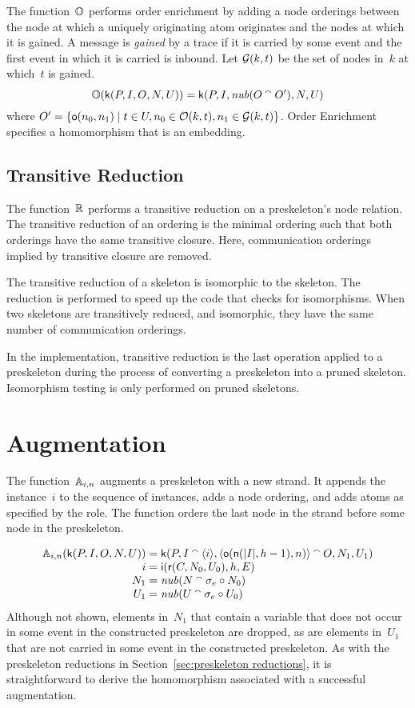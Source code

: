 \documentclass[12pt]{report}
\theoremstyle{definition}
\begin{document}
The function~$\mathbb O$ performs order enrichment by adding a node
orderings between the node at which a uniquely originating atom
originates and the nodes at which it is gained.  A message is
\emph{gained} by a trace if it is carried by some event
and the first event in which it is carried is inbound.  Let $\mathcal{G}(k,
t)$ be the set of nodes in~$k$ at which~$t$ is gained.
$$ \mathbb O(\operatorname{\mathsf{k}}(P, I, O, N, U))=
\operatorname{\mathsf{k}}(P, I, \operatorname{\mathit{nub}}(O\mathbin{{}^\smallfrown} O'), N, U)$$
where $O'=\{\operatorname{\mathsf{o}}(n_0,n_1)\mid t\in U, n_0\in\mathcal{O}(k,t),
n_1\in\mathcal{G}(k,t)\}$.  Order Enrichment specifies a homomorphism that
is an embedding.

\subsection{Transitive Reduction}

The function~$\mathbb R$ performs a transitive reduction on a preskeleton's
node relation.  The transitive reduction
of an ordering is the minimal ordering such that both orderings have
the same transitive closure.  Here, communication orderings implied by
transitive closure are removed.

The transitive reduction of a skeleton is isomorphic to the skeleton.
The reduction is performed to speed up the code that checks for
isomorphisms.  When two skeletons are transitively reduced, and
isomorphic, they have the same number of communication orderings.

In the implementation, transitive reduction is the last operation
applied to a preskeleton during the process of converting a
preskeleton into a pruned skeleton.  Isomorphism testing is only
performed on pruned skeletons.

\section{Augmentation}

The function~$\mathbb A_{i,n}$ augments a preskeleton with a new strand.
It appends the instance~$i$ to the sequence of instances, adds a node
ordering, and adds atoms as specified by the role.  The function
orders the last node in the strand before some node in the
preskeleton.

$$
\begin{array}{r@{}c@{}l}
\ops{A}_{i,n}(\cn{k}(P, I, O, N, U))&{}={}&
\cn{k}(P, I\append\langle i\rangle,
\langle \cn{o}(\cn{n}(|I|,h-1),n)
\rangle \append O,N_1, U_1)\\
i&{}={}&\cn{i}(\cn{r}(C,N_0,U_0),h,E)\\
N_1&{}={}&\fn{nub}(N\append\sigma_e\circ N_0)\\
U_1&{}={}&\fn{nub}(U\append\sigma_e\circ U_0)
\end{array}
$$ Although not shown, elements in~$N_1$ that contain a variable that
does not occur in some event in the constructed preskeleton
are dropped, as are elements in~$U_1$ that are not carried in some
event in the constructed preskeleton.  As with the preskeleton
reductions in Section~\ref{sec:preskeleton reductions}, it is
straightforward to derive the homomorphism associated with a
successful augmentation.
\end{document}
